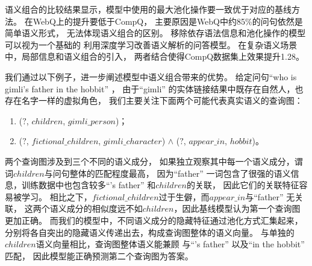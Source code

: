 语义组合的比较结果显示，模型中使用的最大池化操作要一致优于对应的基线方法。
在WebQ上的提升要低于CompQ，
主要原因是WebQ中约85\%的问句依然是简单语义形式，
无法体现语义组合的区别。
移除依存语法信息和池化操作的模型可以视为一个基础的
利用深度学习改善语义解析的问答模型。
在复杂语义场景中，局部信息和语义组合的引入，
两者结合使得CompQ数据集上效果提升1.28。


我们通过以下例子，进一步阐述模型中语义组合带来的优势。
给定问句``who is gimli's father in the hobbit'' ，
由于``gimli'' 的实体链接结果中既存在自然人，也存在名字一样的虚拟角色，
我们主要关注下面两个可能代表真实语义的查询图：
\begin{enumerate}
    \item ($?$, $children$, $gimli\_person$)；
    \item ($?$, $fictional\_children$, $gimli\_character$) $\wedge$ ($?$, $appear\_in$, $hobbit$)。
\end{enumerate}
两个查询图涉及到三个不同的语义成分，
如果独立观察其中每一个语义成分，谓词$children$与问句整体的匹配程度最高，
因为``father'' 一词包含了很强的语义信息，训练数据中也包含较多``'s father'' 和$children$的关联，
因此它们的关联特征容易被学习。
相比之下，$fictional\_children$过于生僻，而$appear\_in$与``father'' 无关联，
这两个语义成分的相似度远不如$children$，因此基线模型认为第一个查询图更加正确。
而我们的模型中，不同语义成分的隐藏特征通过池化方式汇集起来，
分别将各自突出的隐藏语义传递出去，构成查询图整体的语义向量。
与单独的$children$语义向量相比，查询图整体语义能兼顾
与``'s father'' 以及``in the hobbit'' 匹配，
因此模型能正确预测第二个查询图为答案。


